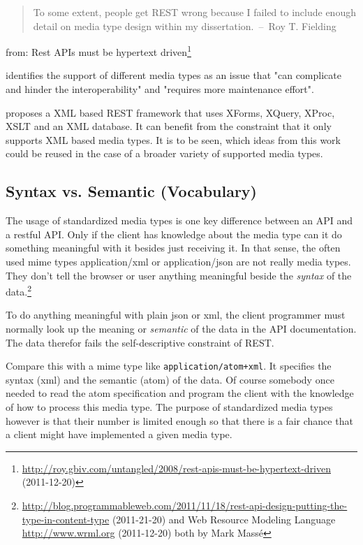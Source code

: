 \documentclass[12pt,a4paper]{scrartcl}		%
\newcommand{\citeurl}[2]{\url{#1} (#2)}
\begin{document}
\begin{quote}
  To some extent, people get REST wrong because I failed to include enough
  detail on media type design within my dissertation.~--~Roy T. Fielding
\end{quote}
from: Rest APIs must be hypertext driven\footnote
  {\citeurl{http://roy.gbiv.com/untangled/2008/rest-apis-must-be-hypertext-driven}{2011-12-20}}

\cite[sec. 7.2]{Pautasso:2008:RWS:1367497.1367606} identifies the support of different media types as an issue that "can complicate and hinder the interoperability" and "requires more maintenance effort".

\cite{Davis:2011:XTR:1967428.1967437} proposes a XML based REST framework that uses XForms, XQuery, XProc, XSLT and an XML database. It can benefit from the constraint that it only supports XML based media types. It is to be seen, which ideas from this work could be reused in the case of a broader variety of supported media types.

\subsection{Syntax vs. Semantic (Vocabulary)}

The usage of standardized media types is one key difference between an API and a
restful API\cite[sec. 5.2.1.2]{Fielding2000}. Only if the client has knowledge
about the media type can it do something meaningful with it besides just
receiving it. In that sense, the often used mime types application/xml or
application/json are not really media types. They don't tell the browser or user
anything meaningful beside the \emph{syntax} of the data.\footnote{
\citeurl{http://blog.programmableweb.com/2011/11/18/rest-api-design-putting-the-type-in-content-type}{2011-21-20}
and Web Resource Modeling Language \citeurl{http://www.wrml.org}{2011-12-20} both by Mark Massé
}

To do anything meaningful with plain json or xml, the client programmer must
normally look up the meaning or \emph{semantic} of the data in the API
documentation. The data therefor fails the self-descriptive constraint of
REST.

Compare this with a mime type like \texttt{application/atom+xml}. It specifies
the syntax (xml) and the semantic (atom) of the data. Of course somebody once
needed to read the atom specification and program the client with the knowledge
of how to process this media type. The purpose of standardized media types
however is that their number is limited enough so that there is a fair chance
that a client might have implemented a given media type.
\end{document}

